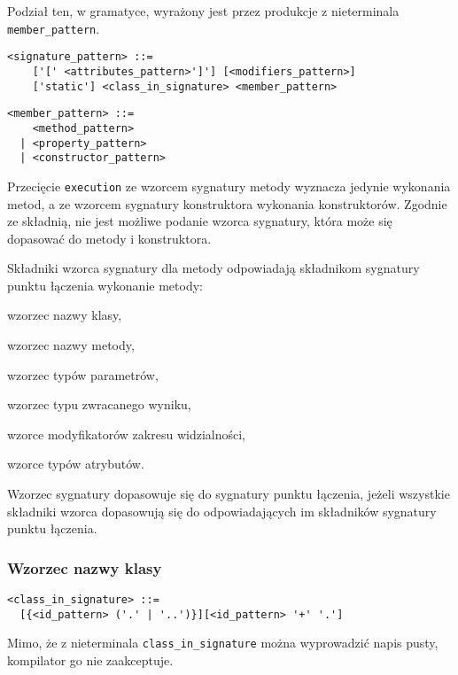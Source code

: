 \documentclass[a4paper,12pt]{mwbk}
\begin{document}
Podział ten, w gramatyce, wyrażony jest przez produkcje z nieterminala \lstinline!member_pattern!.

\begin{lstlisting}[style=grammar]
<signature_pattern> ::=
    ['[' <attributes_pattern>']'] [<modifiers_pattern>] 
    ['static'] <class_in_signature> <member_pattern>
\end{lstlisting}

\begin{lstlisting}[style=grammar]
<member_pattern> ::=
    <method_pattern>
  | <property_pattern>
  | <constructor_pattern>
\end{lstlisting}

Przecięcie \lstinline!execution! ze wzorcem sygnatury metody wyznacza jedynie
wykonania metod, a ze wzorcem sygnatury konstruktora wykonania konstruktorów.
Zgodnie ze składnią, nie jest możliwe podanie wzorca sygnatury, która może się
dopasować do metody i konstruktora.


Składniki wzorca sygnatury dla metody odpowiadają składnikom sygnatury punktu
łączenia wykonanie metody: \begin{itemize*} 
    \item wzorzec nazwy klasy, 
    \item wzorzec nazwy metody, 
    \item wzorzec typów parametrów, 
    \item wzorzec typu zwracanego wyniku, 
    \item wzorce modyfikatorów zakresu widzialności, 
    \item wzorce typów atrybutów.  
\end{itemize*}

Wzorzec sygnatury dopasowuje się do sygnatury punktu łączenia, jeżeli wszystkie
składniki wzorca dopasowują się do odpowiadających im składników sygnatury
punktu łączenia.

\subsubsection{Wzorzec nazwy klasy}\label{wzorzec_nazwy_klasy}

\begin{lstlisting}[style=grammar]
<class_in_signature> ::=
  [{<id_pattern> ('.' | '..')}][<id_pattern> '+' '.']
\end{lstlisting}

Mimo, że z nieterminala \lstinline!class_in_signature! można wyprowadzić napis
pusty, kompilator go nie zaakceptuje.
\end{document}
